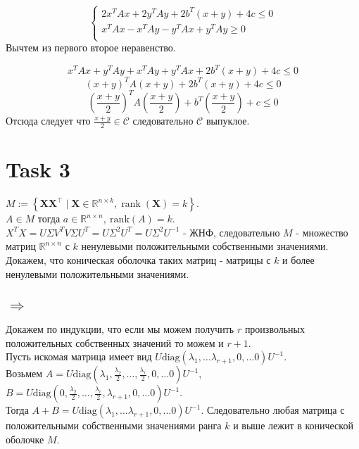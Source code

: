 \documentclass[12pt]{exam}
\begin{document}
\begin{equation}
    \begin{cases}
        2x^T A x + 2y^T A y + 2b^T (x + y) + 4 c \leq 0 \\
        x^T A x - x^T A y - y^T A x + y^T A y \geq 0 \\
    \end{cases}
\end{equation}
Вычтем из первого второе неравенство.

$$ x^T A x + y^T A y + x^T A y + y^T A x + 2b^T (x + y) + 4c \leq 0$$
$$ (x + y)^T A (x + y) + 2b^T (x + y) + 4c \leq 0$$
$$ \left( \frac{x + y}{2} \right)^T A \left( \frac{x + y}{2} \right) + b^T \left( \frac{x + y}{2} \right) + c \leq 0$$
Отсюда следует что $\frac{x + y}{2} \in \mathcal{C}$ следовательно $\mathcal{C}$ выпуклое.

\section*{Task 3}
$M := \left\{\mathbf{X} \mathbf{X}^{\top} \mid \mathbf{X} \in \mathbb{R}^{n \times k}, \operatorname{rank}(\mathbf{X})=k\right\}$.\\
$A \in M$ тогда $a \in \mathbb{R}^{n \times n}, \: \mathrm{rank} (A) = k$. \\
$X^T X = U \Sigma V^T V \Sigma U^T = U \Sigma^2 U^T = U \Sigma^2 U^{-1}$ - ЖНФ,   
следовательно $M$ - множество матриц $\mathbb{R}^{n \times n}$ с $k$ ненулевыми положительными собственными значениями.\\
Докажем, что коническая оболочка таких матриц - матрицы с $k$ и более ненулевыми положительными значениями. \\

\subsection*{$\Rightarrow$}
Докажем по индукции, что если мы можем получить $r$ произвольных положительных собственных значений
то можем и $r + 1$.\\
Пусть искомая матрица имеет вид $U \mathrm{diag} (\lambda_1, \ldots \lambda_{r + 1}, 0, \ldots 0) U^{-1}$.\\
Возьмем 
$A = U \mathrm{diag} \left(\lambda_1 , \frac{\lambda_2}{2}, \ldots, \frac{\lambda_{r}}{2}, 0, \ldots 0 \right) U^{-1}$, 
$B = U \mathrm{diag} \left(0, \frac{\lambda_2}{2}, \ldots, \frac{\lambda_{r}}{2}, \lambda_{r + 1}, 0, \ldots 0 \right) U^{-1}$.\\
Тогда $A + B = U \mathrm{diag} (\lambda_1, \ldots \lambda_{r + 1}, 0, \ldots 0) U^{-1}$.
Следовательно любая матрица с положительными собственными значениями ранга $k$ и выше лежит в конической оболочке $M$.
\end{document}

